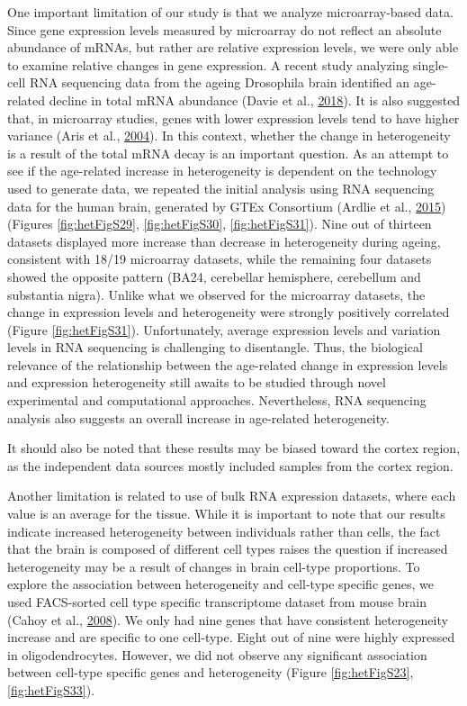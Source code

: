 \documentclass[12pt,twoside]{unicam}
\begin{document}
One important limitation of our study is that we analyze microarray-based data. Since gene expression levels measured by microarray do not reflect an absolute abundance of mRNAs, but rather are relative expression levels, we were only able to examine relative changes in gene expression. A recent study analyzing single-cell RNA sequencing data from the ageing Drosophila brain identified an age-related decline in total mRNA abundance (Davie et al., \protect\hyperlink{ref-Davie2018}{2018}). It is also suggested that, in microarray studies, genes with lower expression levels tend to have higher variance (Aris et al., \protect\hyperlink{ref-Aris2004}{2004}). In this context, whether the change in heterogeneity is a result of the total mRNA decay is an important question. As an attempt to see if the age-related increase in heterogeneity is dependent on the technology used to generate data, we repeated the initial analysis using RNA sequencing data for the human brain, generated by GTEx Consortium (Ardlie et al., \protect\hyperlink{ref-Ardlie2015}{2015}) (Figures \ref{fig:hetFigS29}, \ref{fig:hetFigS30}, \ref{fig:hetFigS31}). Nine out of thirteen datasets displayed more increase than decrease in heterogeneity during ageing, consistent with 18/19 microarray datasets, while the remaining four datasets showed the opposite pattern (BA24, cerebellar hemisphere, cerebellum and substantia nigra). Unlike what we observed for the microarray datasets, the change in expression levels and heterogeneity were strongly positively correlated (Figure \ref{fig:hetFigS31}). Unfortunately, average expression levels and variation levels in RNA sequencing is challenging to disentangle. Thus, the biological relevance of the relationship between the age-related change in expression levels and expression heterogeneity still awaits to be studied through novel experimental and computational approaches. Nevertheless, RNA sequencing analysis also suggests an overall increase in age-related heterogeneity.

It should also be noted that these results may be biased toward the cortex region, as the independent data sources mostly included samples from the cortex region.

Another limitation is related to use of bulk RNA expression datasets, where each value is an average for the tissue. While it is important to note that our results indicate increased heterogeneity between individuals rather than cells, the fact that the brain is composed of different cell types raises the question if increased heterogeneity may be a result of changes in brain cell-type proportions. To explore the association between heterogeneity and cell-type specific genes, we used FACS-sorted cell type specific transcriptome dataset from mouse brain (Cahoy et al., \protect\hyperlink{ref-Cahoy2008}{2008}). We only had nine genes that have consistent heterogeneity increase and are specific to one cell-type. Eight out of nine were highly expressed in oligodendrocytes. However, we did not observe any significant association between cell-type specific genes and heterogeneity (Figure \ref{fig:hetFigS23}, \ref{fig:hetFigS33}).
\end{document}
